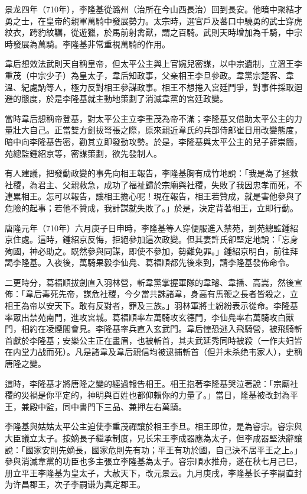 景龙四年（710年），李隆基從潞州（治所在今山西長治）回到長安。他暗中聚結才勇之士，在皇帝的親軍萬騎中發展勢力。太宗時，選官戶及蕃口中驍勇的武士穿虎紋衣，跨豹紋韉，從遊獵，於馬前射禽獸，謂之百騎。武則天時增加為千騎，中宗時發展為萬騎。李隆基非常重視萬騎的作用。

韋后想效法武則天自稱皇帝，但太平公主與上官婉兒密謀，以中宗遺制，立溫王李重茂（中宗少子）為皇太子，韋后知政事，父亲相王李旦參政。韋黨宗楚客、韋溫、紀處訥等人，極力反對相王參謀政事。相王不想捲入宮廷鬥爭，對事件採取迴避的態度，於是李隆基就主動地策劃了消滅韋黨的宮廷政變。

當時韋后想稱帝登基，對太平公主立李重茂為帝不滿；李隆基又借助太平公主的力量壯大自己。正當雙方劍拔弩張之際，原來親近韋氏的兵部侍郎崔日用改變態度，暗中向李隆基告密，勸其立即發動攻勢。於是，李隆基與太平公主的兒子薛崇簡，苑總監鍾紹京等，密謀策劃，欲先發制人。

有人建議，把發動政變的事先向相王報告，李隆基胸有成竹地說：「我是為了拯救社稷，為君主、父親救急，成功了福祉歸於宗廟與社稷，失敗了我因忠孝而死，不連累相王。怎可以報告，讓相王擔心呢！現在報告，相王若贊成，就是害他參與了危險的起事；若他不贊成，我計謀就失敗了。」於是，決定背著相王，立即行動。

唐隆元年（710年）六月庚子日申時，李隆基等人穿便服進入禁苑，到苑總監鍾紹京住處。這時，鍾紹京反悔，拒絕參加這次政變。但其妻許氏卻堅定地說：「忘身殉國，神必助之。既然參與同謀，即使不參加，勢難免罪。」鍾紹京明白，前往拜謁李隆基。入夜後，萬騎果毅李仙鳧、葛福順都先後來到，請李隆基發佈命令。

二更時分，葛福順拔劍直入羽林營，斬韋黨掌握軍隊的韋璿、韋播、高嵩，然後宣佈：「韋后毒死先帝，謀危社稷，今夕當共誅諸韋，身高有馬鞭之長者皆殺之，立相王為帝以安天下。敢有反對者，罪及三族。」羽林軍將士紛紛表示從命。李隆基率眾出禁苑南門，進攻宮城。葛福順率左萬騎攻玄德門，李仙鳧率右萬騎攻白獸門，相約在凌煙閣會見。李隆基率兵直入玄武門。韋后惶恐逃入飛騎營，被飛騎斬首獻於李隆基；安樂公主正在畫眉，也被斬首，其夫武延秀同時被殺（一作夫妇皆在内堂力战而死）。凡是諸韋及韋后親信均被逮捕斬首（但并未杀绝韦家人），史稱唐隆之變。

這時，李隆基才將唐隆之變的經過報告相王。相王抱著李隆基哭泣著說：「宗廟社稷的災禍是你平定的，神明與百姓也都仰賴你的力量了。」當日，隆基被改封為平王，兼殿中監，同中書門下三品、兼押左右萬騎。

李隆基與姑姑太平公主迫使李重茂禪讓於相王李旦。相王即位，是為睿宗。睿宗與大臣議立太子。按嫡長子繼承制度，兄长宋王李成器應為太子，但李成器堅決辭讓說：「國家安則先嫡長，國家危則先有功；平王有功於國，自己決不居平王之上。」參與消滅韋黨的功臣也多主張立李隆基為太子。睿宗順水推舟，遂在秋七月己巳，册立平王李隆基为皇太子，大赦天下，改元景云。九月庚戌，李隆基长子李嗣直封为许昌郡王，次子李嗣谦为真定郡王。

